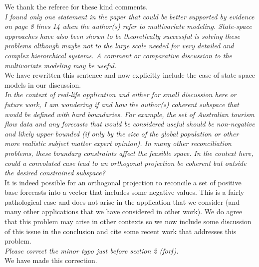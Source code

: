 \documentclass[a4paper,11pt]{article}
\begin{document}
	\noindent We thank the referee for these kind comments.\\
	
    \noindent\textit{I found only one statement in the paper that could be better supported by evidence on page 8 lines 14 when the author(s) refer to multivariate modeling. State-space approaches have also been shown to be theoretically successful is solving these problems although maybe not to the large scale needed for very detailed and complex hierarchical systems. A comment or comparative discussion to the multivariate modeling may be useful.}\\
    
    \noindent We have rewritten this sentence and now explicitly include the case of state space models in our discussion.\\
    
    
    \noindent\textit{In the context of real-life application and either for small discussion here or future work, I am wondering if and how the author(s) coherent subspace that would be defined with hard boundaries. For example, the set of Australian tourism flow data and any forecasts that would be considered useful should be non-negative and likely upper bounded (if only by the size of the global population or other more realistic subject matter expert opinion). In many other reconciliation problems, these boundary constraints affect the feasible space. In the context here, could a convoluted case lead to an orthogonal projection be coherent but outside the desired constrained subspace?}\\
    
    \noindent It is indeed possible for an orthogonal projection to reconcile a set of positive base forecasts into a vector that includes some negative values.  This is a fairly pathological case and does not arise in the application that we consider (and many other applications that we have considered in other work).  We do agree that this problem may arise in other contexts so we now include some discussion of this issue in the conclusion and cite some recent work that addresses this problem.\\

    \noindent\textit{Please correct the minor typo just before section 2 (forf).}\\
    
    \noindent We have made this correction.\\
    
\end{document}
